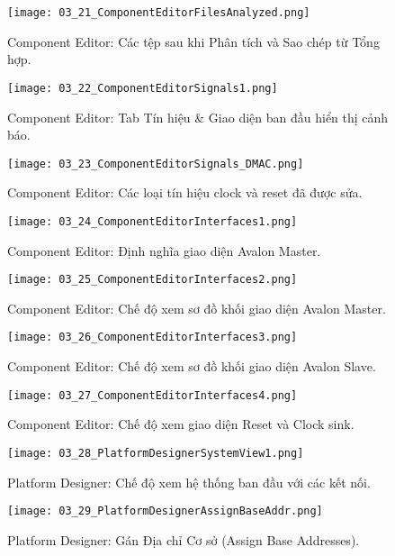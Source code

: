 \begin{figure}[htbp] \centering \texttt{[image: 03\_21\_ComponentEditorFilesAnalyzed.png]} \caption{Component Editor: Các tệp sau khi Phân tích và Sao chép từ Tổng hợp.} \label{fig:03_21} \end{figure}
\begin{figure}[htbp] \centering \texttt{[image: 03\_22\_ComponentEditorSignals1.png]} \caption{Component Editor: Tab Tín hiệu \& Giao diện ban đầu hiển thị cảnh báo.} \label{fig:03_22} \end{figure}
\begin{figure}[htbp] \centering \texttt{[image: 03\_23\_ComponentEditorSignals\_DMAC.png]} \caption{Component Editor: Các loại tín hiệu clock và reset đã được sửa.} \label{fig:03_23} \end{figure}
\begin{figure}[htbp] \centering \texttt{[image: 03\_24\_ComponentEditorInterfaces1.png]} \caption{Component Editor: Định nghĩa giao diện Avalon Master.} \label{fig:03_24} \end{figure}
\begin{figure}[htbp] \centering \texttt{[image: 03\_25\_ComponentEditorInterfaces2.png]} \caption{Component Editor: Chế độ xem sơ đồ khối giao diện Avalon Master.} \label{fig:03_25} \end{figure}
\begin{figure}[htbp] \centering \texttt{[image: 03\_26\_ComponentEditorInterfaces3.png]} \caption{Component Editor: Chế độ xem sơ đồ khối giao diện Avalon Slave.} \label{fig:03_26} \end{figure}
\begin{figure}[htbp] \centering \texttt{[image: 03\_27\_ComponentEditorInterfaces4.png]} \caption{Component Editor: Chế độ xem giao diện Reset và Clock sink.} \label{fig:03_27} \end{figure}
\begin{figure}[htbp] \centering \texttt{[image: 03\_28\_PlatformDesignerSystemView1.png]} \caption{Platform Designer: Chế độ xem hệ thống ban đầu với các kết nối.} \label{fig:03_28} \end{figure}
\begin{figure}[htbp] \centering \texttt{[image: 03\_29\_PlatformDesignerAssignBaseAddr.png]} \caption{Platform Designer: Gán Địa chỉ Cơ sở (Assign Base Addresses).} \label{fig:03_29} \end{figure}
